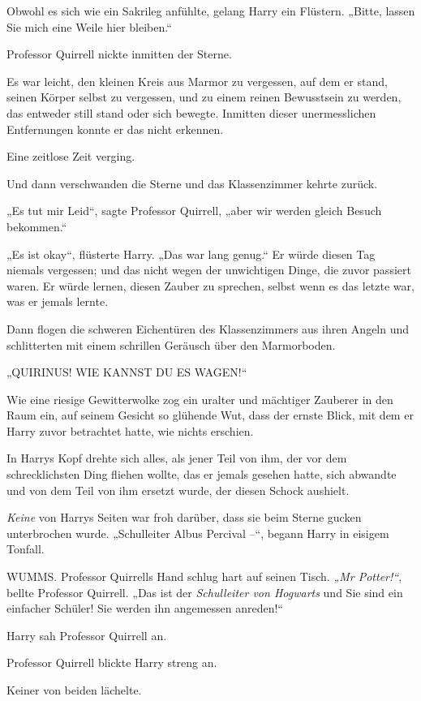 {Obwohl es sich wie ein Sakrileg anfühlte, gelang Harry ein Flüstern. „Bitte, lassen Sie mich eine Weile hier bleiben.“

Professor Quirrell nickte inmitten der Sterne.

Es war leicht, den kleinen Kreis aus Marmor zu vergessen, auf dem er stand, seinen Körper selbst zu vergessen, und zu einem reinen Bewusstsein zu werden, das entweder still stand oder sich bewegte. Inmitten dieser unermesslichen Entfernungen konnte er das nicht erkennen.

Eine zeitlose Zeit verging.

Und dann verschwanden die Sterne und das Klassenzimmer kehrte zurück.

„Es tut mir Leid“, sagte Professor Quirrell, „aber wir werden gleich Besuch bekommen.“

„Es ist okay“, flüsterte Harry. „Das war lang genug.“ Er würde diesen Tag niemals vergessen; und das nicht wegen der unwichtigen Dinge, die zuvor passiert waren. Er würde lernen, diesen Zauber zu sprechen, selbst wenn es das letzte war, was er jemals lernte.

Dann flogen die schweren Eichentüren des Klassenzimmers aus ihren Angeln und schlitterten mit einem schrillen Geräusch über den Marmorboden.

„QUIRINUS! WIE KANNST DU ES WAGEN!“

Wie eine riesige Gewitterwolke zog ein uralter und mächtiger Zauberer in den Raum ein, auf seinem Gesicht so glühende Wut, dass der ernste Blick, mit dem er Harry zuvor betrachtet hatte, wie nichts erschien.

In Harrys Kopf drehte sich alles, als jener Teil von ihm, der vor dem schrecklichsten Ding fliehen wollte, das er jemals gesehen hatte, sich abwandte und von dem Teil von ihm ersetzt wurde, der diesen Schock aushielt.

\emph{Keine} von Harrys Seiten war froh darüber, dass sie beim Sterne gucken unterbrochen wurde. „Schulleiter Albus Percival --“, begann Harry in eisigem Tonfall.

WUMMS. Professor Quirrells Hand schlug hart auf seinen Tisch. \emph{„Mr Potter!“}, bellte Professor Quirrell. „Das ist der \emph{Schulleiter von Hogwarts} und Sie sind ein einfacher Schüler! Sie werden ihn angemessen anreden!“

Harry sah Professor Quirrell an.

Professor Quirrell blickte Harry streng an.

Keiner von beiden lächelte.

}
